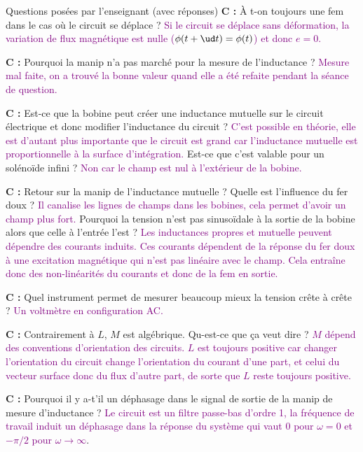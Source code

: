 \begin{reportBlock}{Questions posées par l’enseignant (avec réponses)}
  \textbf{C :} \`{A} t-on toujours une fem dans le cas où le circuit se déplace ? \textcolor{purple}{Si le circuit se déplace sans déformation, la variation de flux magnétique est nulle ($\phi(t+\ud t) = \phi(t)$) et donc $e=0$.}\newline
  
  \textbf{C :} Pourquoi la manip n'a pas marché pour la mesure de l'inductance ? \textcolor{purple}{Mesure mal faite, on a trouvé la bonne valeur quand elle a été refaite pendant la séance de question.}  \newline
  
  \textbf{C :} Est-ce que la bobine peut créer une inductance mutuelle sur le circuit électrique et donc modifier l'inductance du circuit ? \textcolor{purple}{C'est possible en théorie, elle est d'autant plus importante que le circuit est grand car l'inductance mutuelle est proportionnelle à la surface d'intégration.} Est-ce que c'est valable pour un solénoïde infini ? \textcolor{purple}{Non car le champ est nul à l'extérieur de la bobine.}\newline
  
  \textbf{C :} Retour sur la manip de l'inductance mutuelle ? Quelle est l'influence du fer doux ? \textcolor{purple}{Il canalise les lignes de champs dans les bobines, cela permet d'avoir un champ plus fort.} Pourquoi la tension n'est pas sinusoïdale à la sortie de la bobine alors que celle à l'entrée l'est ? \textcolor{purple}{Les inductances propres et mutuelle peuvent dépendre des courants induits. Ces courants dépendent de la réponse du fer doux à une excitation magnétique qui n'est pas linéaire avec le champ. Cela entraîne donc des non-linéarités du courants et donc de la fem en sortie.}\newline
  
  \textbf{C :} Quel instrument permet de mesurer beaucoup mieux la tension crête à crête ? \textcolor{purple}{Un voltmètre en configuration AC.}\newline
  
  \textbf{C :} Contrairement à $L$, $M$ est algébrique. Qu-est-ce que ça veut dire ? \textcolor{purple}{$M$ dépend des conventions d'orientation des circuits. $L$ est toujours positive car changer l'orientation du circuit change l'orientation du courant d'une part, et celui du vecteur surface donc du flux d'autre part, de sorte que $L$ reste toujours positive.}\newline
  
  \textbf{C :} Pourquoi il y a-t'il un déphasage dans le signal de sortie de la manip de mesure d'inductance ? \textcolor{purple}{Le circuit est un filtre passe-bas d'ordre 1, la fréquence de travail induit un déphasage dans la réponse du système qui vaut $0$ pour $\omega=0$ et $-\pi/2$ pour $\omega\rightarrow\infty$}.
  
  
\end{reportBlock}


